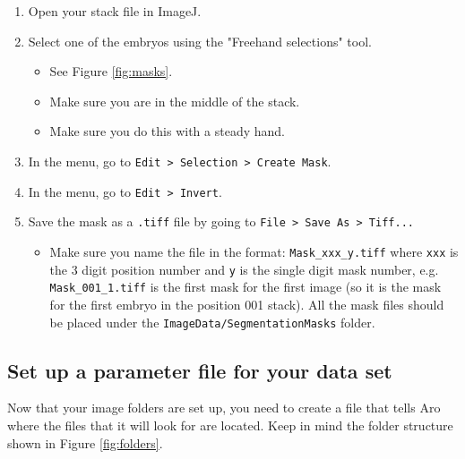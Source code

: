 \documentclass[titlepage,11pt]{article}
\begin{document}
\begin{enumerate}
\item Open your stack file in ImageJ.
\item Select one of the embryos using the "Freehand selections" tool.
\begin{itemize}
\item See Figure \ref{fig:masks}.
\item Make sure you are in the middle of the stack.
\item Make sure you do this with a steady hand.
\end{itemize}
\item In the menu, go to \texttt{Edit > Selection > Create Mask}.
\item In the menu, go to \texttt{Edit > Invert}.
\item Save the mask as a \texttt{.tiff} file by going to \texttt{File > Save As > Tiff...}
\begin{itemize}
\item Make sure you name the file in the format: \texttt{Mask\_xxx\_y.tiff} where \texttt{xxx} is the 3 digit position number and \texttt{y} is the single digit mask number, e.g. \texttt{Mask\_001\_1.tiff} is the first mask for the first image (so it is the mask for the first embryo in the position 001 stack). All the mask files should be placed under the \texttt{ImageData/SegmentationMasks} folder.
\end{itemize}
\end{enumerate}

\subsection{Set up a parameter file for your data set}

Now that your image folders are set up, you need to create a file that tells Aro where the files that it will look for are located. Keep in mind the folder structure shown in Figure \ref{fig:folders}.
\end{document}
